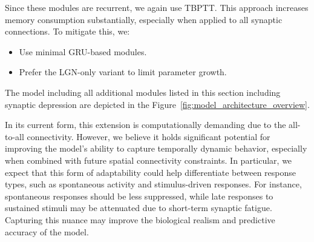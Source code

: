 Since these modules are recurrent, we again use TBPTT. This approach increases memory consumption substantially, especially when applied to all synaptic connections. To mitigate this, we:
\begin{itemize}
    \item Use minimal GRU-based modules.
    \item Prefer the LGN-only variant to limit parameter growth.
\end{itemize}

The model including all additional modules listed in this section including synaptic depression are depicted in the Figure~\ref{fig:model_architecture_overview}.

In its current form, this extension is computationally demanding due to the all-to-all connectivity. However, we believe it holds significant potential for improving the model's ability to capture temporally dynamic behavior, especially when combined with future spatial connectivity constraints. In particular, we expect that this form of adaptability could help differentiate between response types, such as spontaneous activity and stimulus-driven responses. For instance, spontaneous responses should be less suppressed, while late responses to sustained stimuli may be attenuated due to short-term synaptic fatigue. Capturing this nuance may improve the biological realism and predictive accuracy of the model.
